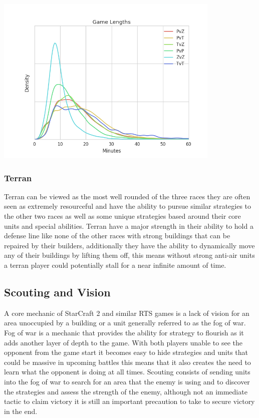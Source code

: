 \documentclass[a4paper,12pt]{report}
\begin{document}
\begin{center}
    \captionsetup{type=figure}
    \includegraphics[width=.5\linewidth]{media/GameLength.png}
\end{center}

\subsubsection{Terran}

Terran can be viewed as the most well rounded of the three races they are often seen as extremely resourceful and have the ability to pursue similar strategies to the other two races as well as some unique strategies based around their core units and special abilities. Terran have a major strength in their ability to hold a defense line like none of the other races with strong buildings that can be repaired by their builders, additionally they have the ability to dynamically move any of their buildings by lifting them off, this means without strong anti-air units a terran player could potentially stall for a near infinite amount of time.

\subsection{Scouting and Vision}

A core mechanic of StarCraft 2 and similar RTS games is a lack of vision for an area unoccupied by a building or a unit generally referred to as the fog of war. Fog of war is a mechanic that provides the ability for strategy to flourish as it adds another layer of depth to the game. With both players unable to see the opponent from the game start it becomes easy to hide strategies and units that could be massive in upcoming battles this means that it also creates the need to learn what the opponent is doing at all times. Scouting consists of sending units into the fog of war to search for an area that the enemy is using and to discover the strategies and assess the strength of the enemy, although not an immediate tactic to claim victory it is still an important precaution to take to secure victory in the end.
\end{document}
